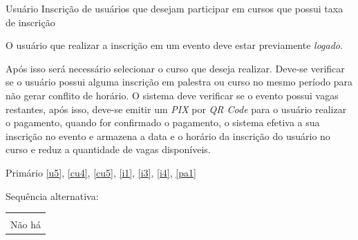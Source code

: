 {Usuário}
{Inscrição de usuários que desejam participar em cursos que possui taxa de inscrição}
{O usuário que realizar a inscrição em um evento deve estar previamente \textit{logado}.

Após isso será necessário selecionar o curso que deseja realizar. Deve-se verificar se o usuário possui alguma inscrição em palestra ou curso no mesmo período para não gerar conflito de horário. O sistema deve verificar se o evento possui vagas restantes, após isso, deve-se emitir um \textit{PIX} por \textit{QR Code} para o usuário realizar o pagamento, quando for confirmado o pagamento, o sistema efetiva a sua inscrição no evento e armazena a data e o horário da inscrição do usuário no curso e reduz a quantidade de vagas disponíveis.}
{Primário}
{\ref{u5}, \ref{cu4}, \ref{cu5}, \ref{i1}, \ref{i3}, \ref{i4}, \ref{pa1}}


Sequência alternativa:
\begin{table}[H]
    \centering
    \begin{tabular}{|p{15cm}|}
        \hline\\
            Não há\\
        \hline
    \end{tabular}
\end{table}


